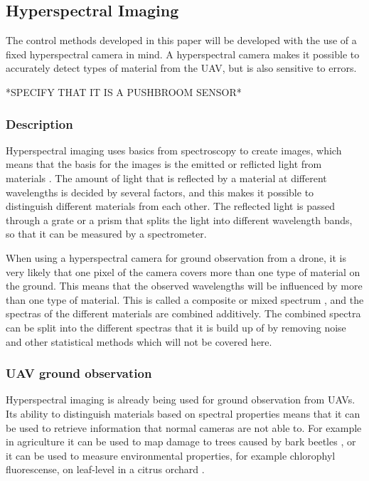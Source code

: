 \subsection{Hyperspectral Imaging}
The control methods developed in this paper will be developed with the use of a fixed hyperspectral camera in mind. A hyperspectral camera makes it possible to accurately detect types of material from the UAV, but is also sensitive to errors.

*SPECIFY THAT IT IS A PUSHBROOM SENSOR*

\subsubsection{Description}
Hyperspectral imaging uses basics from spectroscopy to create images, which means that the basis for the images is the emitted or reflicted light from materials \cite{hypSMITH}. The amount of light that is reflected by a material at different wavelengths is decided by several factors, and this makes it possible to distinguish different materials from each other. The reflected light is passed through a grate or a prism that splits the light into different wavelength bands, so that it can be measured by a spectrometer.

When using a hyperspectral camera for ground observation from a drone, it is very likely that one pixel of the camera covers more than one type of material on the ground. This means that the observed wavelengths will be influenced by more than one type of material. This is called a composite or mixed spectrum \cite{hypSMITH}, and the spectras of the different materials are combined additively. The combined spectra can be split into the different spectras that it is build up of by removing noise and other statistical methods which will not be covered here.


\subsubsection{UAV ground observation}
Hyperspectral imaging is already being used for ground observation from UAVs. Its ability to distinguish materials based on spectral properties means that it can be used to retrieve information that normal cameras are not able to. For example in agriculture it can be used to map damage to trees caused by bark beetles \cite{beetleNASI}, or it can be used to measure environmental properties, for example chlorophyl fluorescense, on leaf-level in a citrus orchard \cite{waterStressBERNI}.

